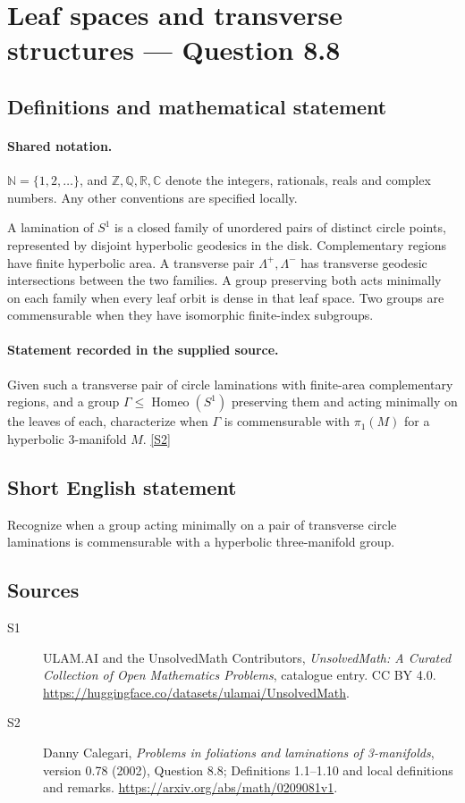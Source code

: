 \documentclass[11pt]{article}
\newcommand{\sref}[2]{\hyperlink{source:#1:#2}{[S#2]}}
\begin{document}
\section{Leaf spaces and transverse structures — Question 8.8}\label{statement}

\subsection{Definitions and mathematical statement}

\paragraph{Shared notation.}$\mathbb N=\{1,2,\ldots\}$, and $\mathbb Z,\mathbb Q,\mathbb R,\mathbb C$ denote the integers, rationals, reals and complex numbers. Any other conventions are specified locally.


A lamination of $S^1$ is a closed family of unordered pairs of distinct circle points, represented by disjoint hyperbolic geodesics in the disk. Complementary regions have finite hyperbolic area. A transverse pair $\Lambda^+,\Lambda^-$ has transverse geodesic intersections between the two families. A group preserving both acts minimally on each family when every leaf orbit is dense in that leaf space. Two groups are commensurable when they have isomorphic finite-index subgroups.
\paragraph{Statement recorded in the supplied source.}
Given such a transverse pair of circle laminations with finite-area complementary regions, and a group $\Gamma\le\operatorname{Homeo}(S^1)$ preserving them and acting minimally on the leaves of each, characterize when $\Gamma$ is commensurable with $\pi_1(M)$ for a hyperbolic $3$-manifold $M$. \sref{statement}{2}
\subsection{Short English statement}
Recognize when a group acting minimally on a pair of transverse circle laminations is commensurable with a hyperbolic three-manifold group.
\subsection{Sources}
\begin{description}
\item[\hypertarget{source:statement:1}{S1}] ULAM.AI and the UnsolvedMath Contributors, \emph{UnsolvedMath: A Curated Collection of Open Mathematics Problems}, catalogue entry. CC BY 4.0. \url{https://huggingface.co/datasets/ulamai/UnsolvedMath}.
\item[\hypertarget{source:statement:2}{S2}] Danny Calegari, \emph{Problems in foliations and laminations of 3-manifolds}, version 0.78 (2002), Question 8.8; Definitions 1.1--1.10 and local definitions and remarks. \url{https://arxiv.org/abs/math/0209081v1}.
\end{description}
\label{end:statement}
\end{document}
